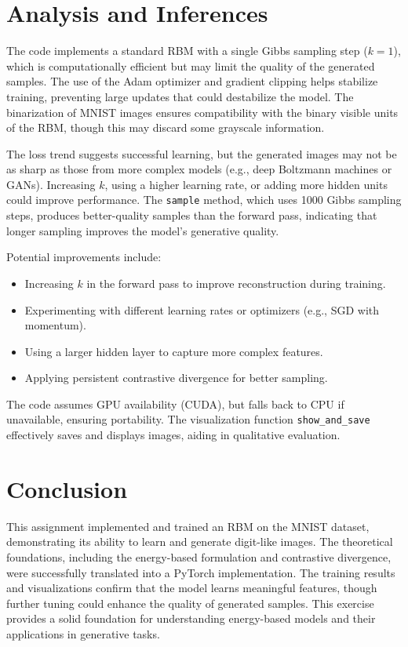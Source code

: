 \documentclass{article}
\begin{document}
\section{Analysis and Inferences}
The code implements a standard RBM with a single Gibbs sampling step (\( k=1 \)), which is computationally efficient but may limit the quality of the generated samples. The use of the Adam optimizer and gradient clipping helps stabilize training, preventing large updates that could destabilize the model. The binarization of MNIST images ensures compatibility with the binary visible units of the RBM, though this may discard some grayscale information.

The loss trend suggests successful learning, but the generated images may not be as sharp as those from more complex models (e.g., deep Boltzmann machines or GANs). Increasing \( k \), using a higher learning rate, or adding more hidden units could improve performance. The \texttt{sample} method, which uses 1000 Gibbs sampling steps, produces better-quality samples than the forward pass, indicating that longer sampling improves the model's generative quality.

Potential improvements include:
\begin{itemize}
    \item Increasing \( k \) in the forward pass to improve reconstruction during training.
    \item Experimenting with different learning rates or optimizers (e.g., SGD with momentum).
    \item Using a larger hidden layer to capture more complex features.
    \item Applying persistent contrastive divergence for better sampling.
\end{itemize}

The code assumes GPU availability (CUDA), but falls back to CPU if unavailable, ensuring portability. The visualization function \texttt{show\_and\_save} effectively saves and displays images, aiding in qualitative evaluation.

\section{Conclusion}
This assignment implemented and trained an RBM on the MNIST dataset, demonstrating its ability to learn and generate digit-like images. The theoretical foundations, including the energy-based formulation and contrastive divergence, were successfully translated into a PyTorch implementation. The training results and visualizations confirm that the model learns meaningful features, though further tuning could enhance the quality of generated samples. This exercise provides a solid foundation for understanding energy-based models and their applications in generative tasks.
\end{document}
